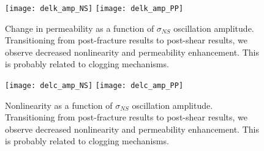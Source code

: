 %
%


\newpage


\begin{figure}[ht]
	\centering
	\texttt{[image: delk\_amp\_NS]}
	\texttt{[image: delk\_amp\_PP]}
	\caption{Change in permeability as a function of $ \sigma_{NS} $ oscillation amplitude. Transitioning from post-fracture results to post-shear results, we observe decreased nonlinearity and permeability enhancement. This is probably related to clogging mechanisms.}%
	\label{fig:perm_ns_amp}
\end{figure}

\newpage

\begin{figure}[ht]
	\centering
	\texttt{[image: delc\_amp\_NS]}
	\texttt{[image: delc\_amp\_PP]}
	\caption{Nonlinearity as a function of $ \sigma_{NS} $ oscillation amplitude. Transitioning from post-fracture results to post-shear results, we observe decreased nonlinearity and permeability enhancement. This is probably related to clogging mechanisms.}%
	\label{fig:delc_ns_amp}
\end{figure}

